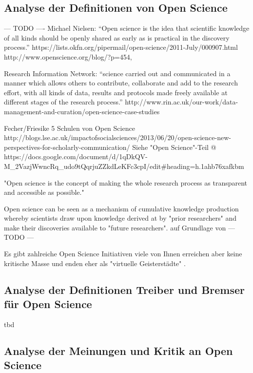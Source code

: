 \subsection{Analyse der Definitionen von Open Science} 

--- TODO ---- Michael Nielsen: “Open science is the idea that scientific knowledge of all kinds should be openly shared as early as is practical in the discovery process.”  https://lists.okfn.org/pipermail/open-science/2011-July/000907.html
http://www.openscience.org/blog/?p=454,

Research Information Network: “science carried out and communicated in a manner which allows others to contribute, collaborate and add to the research effort, with all kinds of data, results and protocols made freely available at different stages of the research process.” http://www.rin.ac.uk/our-work/data-management-and-curation/open-science-case-studies

Fecher/Friesike 5 Schulen von Open Science http://blogs.lse.ac.uk/impactofsocialsciences/2013/06/20/open-science-new-perspectives-for-scholarly-communication/ 
Siehe "Open Science"-Teil @ https://docs.google.com/document/d/1qDkQV-M_2VazjWwncRq_udo9tQqrjuZZkdLeKFc3cpI/edit#heading=h.1ahb76xafkbm

"Open science is the concept of making the whole research process as transparent and accessible as possible."\cite{Scheliga_2014}

Open science can be seen as a mechanism of cumulative knowledge production whereby scientists draw upon knowledge derived at by "prior researchers" and make their discoveries available to "future researchers". \cite{Scheliga_2014} auf Grundlage von \cite{Mukherjee_2009}
--- TODO ---

Es gibt zahlreiche Open Science Initiativen \cite{Scheliga_2014} viele von Ihnen erreichen aber keine kritische Masse \cite{wrap_2010} und enden eher als "virtuelle Geisterstädte" \cite{Nielsen_2011}.

\subsection{Analyse der Definitionen Treiber und Bremser für Open Science} 
tbd

\subsection{Analyse der Meinungen und Kritik an Open Science}

